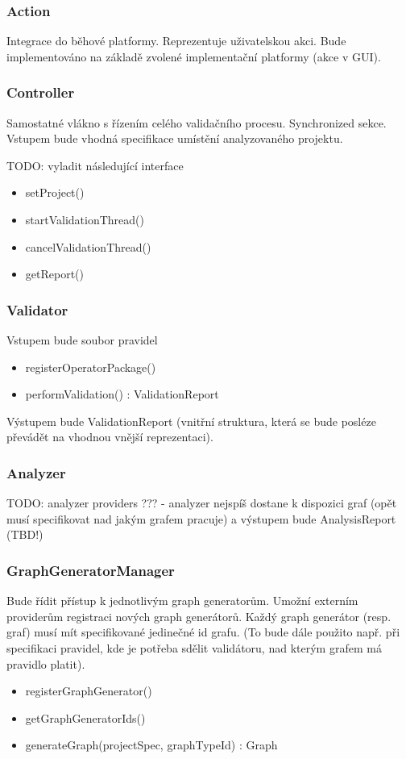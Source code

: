 \subsubsection{Action}
Integrace do běhové platformy. Reprezentuje uživatelskou akci. Bude implementováno na základě zvolené implementační platformy (akce v GUI).

\subsubsection{Controller}
Samostatné vlákno s řízením celého validačního procesu. Synchronized sekce. Vstupem bude vhodná specifikace umístění analyzovaného projektu.

TODO: vyladit následující interface
\begin{itemize}
\item setProject()
\item startValidationThread()
\item cancelValidationThread()
\item getReport()
\end{itemize}

\subsubsection{Validator}
Vstupem bude soubor pravidel

\begin{itemize}
\item registerOperatorPackage()
\item performValidation() : ValidationReport
\end{itemize}

Výstupem bude ValidationReport (vnitřní struktura, která se bude posléze převádět na vhodnou vnější reprezentaci).

\subsubsection{Analyzer}
TODO: analyzer providers ??? - analyzer nejspíš dostane k dispozici graf (opět musí specifikovat nad jakým grafem pracuje) a výstupem bude AnalysisReport (TBD!)

\subsubsection{GraphGeneratorManager}
Bude řídit přístup k jednotlivým graph generatorům. Umožní externím providerům registraci nových graph generátorů. Každý graph generátor (resp. graf) musí mít specifikované jedinečné id grafu. (To bude dále použito např. při specifikaci pravidel, kde je potřeba sdělit validátoru, nad kterým grafem má pravidlo platit).
\begin{itemize}
\item registerGraphGenerator()
\item getGraphGeneratorIds()
\item generateGraph(projectSpec, graphTypeId) : Graph
\end{itemize}

